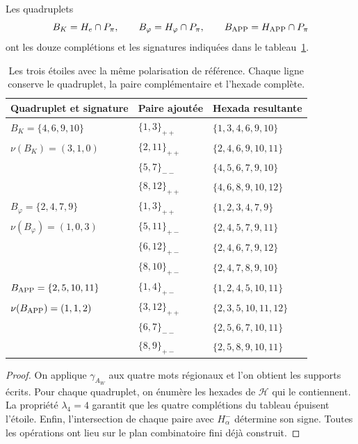 \begin{proposition}
\label{star27:tres}
Les quadruplets
\[
B_K=H_e\cap P_\pi,\qquad
B_\varphi=H_\varphi\cap P_\pi,\qquad
B_{\rm APP}=H_{\rm APP}\cap P_\pi
\]
ont les douze complétions et les signatures indiquées dans le
tableau~\ref{star27:tabla-tres}.
\end{proposition}

\begin{table}[htbp]
\centering\small
\begin{tabular}{lll}
\toprule
Quadruplet et signature & Paire ajoutée & Hexada resultante\\
\midrule
\(B_K=\{4,6,9,10\}\) & \(\{1,3\}_{++}\) & \(\{1,3,4,6,9,10\}\)\\
\(\nu(B_K)=(3,1,0)\) & \(\{2,11\}_{++}\) & \(\{2,4,6,9,10,11\}\)\\
 & \(\{5,7\}_{--}\) & \(\{4,5,6,7,9,10\}\)\\
 & \(\{8,12\}_{++}\) & \(\{4,6,8,9,10,12\}\)\\
\midrule
\(B_\varphi=\{2,4,7,9\}\) & \(\{1,3\}_{++}\) & \(\{1,2,3,4,7,9\}\)\\
\(\nu(B_\varphi)=(1,0,3)\) & \(\{5,11\}_{+-}\) & \(\{2,4,5,7,9,11\}\)\\
 & \(\{6,12\}_{+-}\) & \(\{2,4,6,7,9,12\}\)\\
 & \(\{8,10\}_{+-}\) & \(\{2,4,7,8,9,10\}\)\\
\midrule
\(B_{\rm APP}=\{2,5,10,11\}\) & \(\{1,4\}_{+-}\) & \(\{1,2,4,5,10,11\}\)\\
\(\nu(B_{\rm APP})=(1,1,2)\) & \(\{3,12\}_{++}\) & \(\{2,3,5,10,11,12\}\)\\
 & \(\{6,7\}_{--}\) & \(\{2,5,6,7,10,11\}\)\\
 & \(\{8,9\}_{+-}\) & \(\{2,5,8,9,10,11\}\)\\
\bottomrule
\end{tabular}
\caption{Les trois étoiles avec la même polarisation de référence.
Chaque ligne conserve le quadruplet, la paire complémentaire et l'hexade complète.}
\label{star27:tabla-tres}
\end{table}

\begin{proof}
On applique \(\gamma_{A_W}\) aux quatre mots régionaux et l'on obtient les supports écrits. Pour chaque quadruplet, on énumère les hexades de \(\mathcal H\) qui le contiennent. La propriété \(\lambda_4=4\) garantit que les quatre complétions du tableau épuisent l'étoile. Enfin, l'intersection de chaque paire avec \(H^-_\alpha\) détermine son signe. Toutes les opérations ont lieu sur le plan combinatoire fini déjà construit.
\end{proof}

